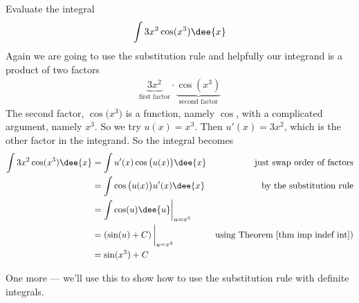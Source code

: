 \begin{eg}
 Evaluate the integral
\begin{align*}
\int 3x^2 \cos(x^3) \dee{x}
\end{align*}
\soln Again we are going to use the substitution rule and helpfully our integrand is a
product of two factors
\begin{align*}
\underbrace{3x^2}_\text{first factor} \cdot
\underbrace{\cos(x^3)}_\text{second factor}
\end{align*}
The second factor, $\cos\big(x^3\big)$ is a function, namely $\cos$, with a complicated
argument, namely $x^3$. So we try $u(x)= x^3$. Then $u'(x) = 3x^2$, which is the other
factor in the integrand. So the integral becomes
\begin{align*}
  \int 3x^2 \cos(x^3) \dee{x}
&= \int u'(x) \cos\big(u(x)\big) \dee{x} &\text{just swap order of factors}\\
&= \int \cos\big(u(x)\big) u'(x) \dee{x} & \text{by the substitution rule}\\
&= \int \cos(u) \dee{u}\bigg|_{u=x^3} \\
&= \left( \sin(u) + C\right)\bigg|_{u=x^3}  & \text{using Theorem~\ref{thm imp indef
int})}\\
&= \sin(x^3)+C
\end{align*}
\end{eg}
One more --- we'll use this to show how to use the substitution rule with definite
integrals.
